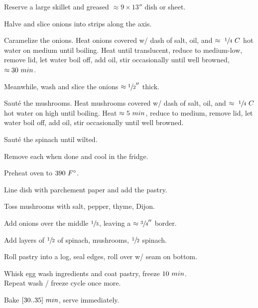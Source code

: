 \begin{preparation}
\item Reserve a large skillet and greased $\approx9\times13''$ dish or sheet.
\item Halve and slice onions into strips along the axis.
\item Caramelize the onions.
    Heat onions covered w/ dash of salt, oil, and $\approx~\onefourth~C$ hot water on medium until boiling.
    Heat until translucent, reduce to medium-low, remove lid, let water boil off, add oil, stir occasionally
    until well browned, $\approx30~\minute$.
\item Meanwhile, wash and slice the onions $\approx\onehalf''$ thick.
\item Saut\'{e} the mushrooms.
    Heat mushrooms covered w/ dash of salt, oil, and $\approx~\onefourth~C$ hot water on high until boiling.
    Heat $\approx5~\minute$, reduce to medium, remove lid, let water boil off, add oil, stir occasionally
    until well browned.
\item Saut\'{e} the spinach until wilted.
\item Remove each when done and cool in the fridge.
\item Preheat oven to $390~\Fahrenheit$.
\item Line dish with parchement paper and add the pastry.
\item Toss mushrooms with salt, pepper, thyme, Dijon.
\item Add onions over the middle $\onethird$, leaving a $\approx\threefourth''$ border.
\item Add layers of $\onehalf$ of spinach, mushrooms, $\onehalf$ spinach.
\item Roll pastry into a log, seal edges, roll over w/ seam on bottom.
\item Whisk egg wash ingredients and coat pastry, freeze $10~\minute$.\\
    Repeat wash / freeze cycle once more.
\item Bake $[30..35]~\minute$, serve immediately.
\end{preparation}

\recipeend%
